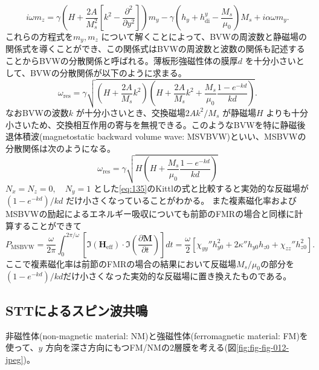 \documentclass[dvipdfmx,11pt]{jsreport}
\numberwithin{equation}{chapter}
\numberwithin{table}{chapter}
\begin{document}
\begin{equation}
\label{eq:152}
	i\omega m_z=\gamma\left( H+\frac{2A}{M_s^2}\left[ k^2-\frac{\partial ^2}{\partial y^2}  \right]  \right) m_y-\gamma\left( h_y+h^{y}_\text{di} -\frac{M_s}{\mu_0} \right) M_s+i\alpha\omega m_y
.\end{equation}
これらの方程式を$m_y,m_z$ について解くことによって、BVWの周波数と静磁場の関係式を導くことができ、この関係式はBVWの周波数と波数の関係も記述することからBVWの分散関係と呼ばれる。薄板形強磁性体の膜厚$d$ を十分小さいとして、BVWの分散関係が以下のように求まる\cite{ku}。
\begin{equation}
\label{eq:153}
	\omega_\text{res} =\gamma \sqrt{\left( H+\frac{2A}{M_s}k^2 \right) \left( H+\frac{2A}{M_s}k^2+\frac{M_s}{\mu_0}\frac{1-e^{-kd}}{kd} \right) } 
.\end{equation}
なおBVWの波数$k$ が十分小さいとき、交換磁場$2Ak^2 /M_s$ が静磁場$H$ よりも十分小さいため、交換相互作用の寄与を無視できる。このようなBVWを特に静磁後退体積波(magnetostatic backward volume wave: MSVBVW)といい、MSBVWの分散関係は次のようになる。
\begin{equation}
\label{eq:154}
	\omega_\text{res} =\gamma \sqrt{H\left( H+\frac{M_s}{\mu_0}\frac{1-e^{-kd}}{kd} \right) } 
\end{equation}
$N_x=N_z=0,\quad N_y=1$ とした\eqref{eq:135}のKittlの式と比較すると実効的な反磁場が$(1-e^{-kd })/kd$ だけ小さくなっていることがわかる。
また複素磁化率およびMSBVWの励起によるエネルギー吸収についても前節のFMRの場合と同様に計算することができて
\begin{equation}
\label{eq:155}
	P_\text{MSBVW} =\frac{\omega}{2\pi }\int_{0}^{2\pi /\omega} \left[ \Im(\bm{H}_\text{eff} )\cdot \Im\left( \frac{\partial \bm{M}}{\partial t}  \right)  \right]  dt=\frac{\omega}{2}\left[ \chi_{yy}'' h^2_{y0}+2\kappa'' h_{y 0}h_{z 0}+\chi_{zz}'' h^2_{z 0} \right] 
.\end{equation}
ここで複素磁化率は前節のFMRの場合の結果において反磁場$M_s /\mu_0$の部分を$(1-e^{-kd}) /kd$だけ小さくなった実効的な反磁場に置き換えたものである。
\subsection{STTによるスピン波共鳴}
非磁性体(non-magnetic material: NM)と強磁性体(ferromagnetic material: FM)を使って、$y$ 方向を深さ方向にもつFM/NMの2層膜を考える(図\ref{fig:fig-fig-012-jpeg})。
\end{document}
